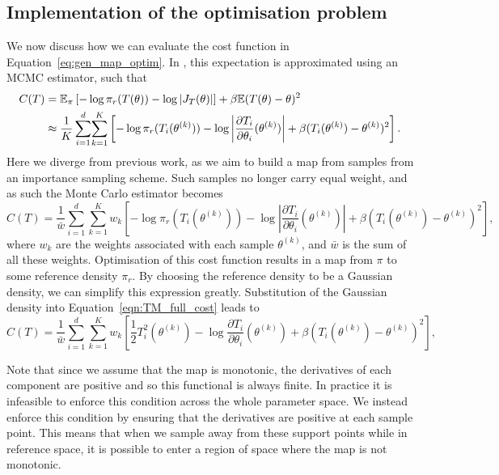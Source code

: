\documentclass[final]{siamltex}
\begin{document}
\subsection{Implementation of the optimisation problem}\label{sec:transport_implementation}

We now discuss how we can evaluate the cost function in
Equation~\eqref{eq:gen_map_optim}. In \cite{parno2014transport}, this
expectation is approximated using an MCMC estimator, such that
\begin{align}
	C(T) &= \mathbb{E}_\pi\left[ -\log\pi_r(T(\theta)) - \log|J_T(\theta)|\right] +
			\beta\mathbb{E}(T(\theta)-\theta)^2 \notag \\
		&\approx \frac{1}{K}\sum\limits_{i=1}^d \! \sum\limits_{k=1}^K \left[-\log\pi_r(T_i(\theta^{(k)})) -
			\log\left|\frac{\partial T_i}{\partial \theta_i}(\theta^{(k)})\right| + \beta(T_i(\theta^{(k)})-\theta^{(k)})^2\right]. 
\end{align}
Here we diverge from previous work, as we aim to build a map from
samples from an importance sampling scheme. Such samples no longer
carry equal weight, and as such the Monte Carlo estimator becomes
\begin{equation}\label{eqn:TM_full_cost}
	C(T) = \frac{1}{\bar{w}}\sum\limits_{i=1}^d \! \sum\limits_{k=1}^K
		w_k \left[-\log\pi_r(T_i(\theta^{(k)})) -
			\log\left|\frac{\partial T_i}{\partial \theta_i}(\theta^{(k)})\right| + \beta(T_i(\theta^{(k)})-\theta^{(k)})^2\right],
\end{equation}
where $w_k$ are the weights associated with each sample $\theta^{(k)}$, and $\bar{w}$ is the sum of
all these weights. Optimisation of this cost function results in a map from $\pi$ to some reference density $\pi_r$. By choosing the reference density to be a Gaussian density, we can simplify this expression greatly. Substitution of the Gaussian density into Equation~\eqref{eqn:TM_full_cost} leads to
\begin{equation}\label{eqn:TPAIS_objective}
	C(T) = \frac{1}{\bar{w}}\sum\limits_{i=1}^d \! \sum\limits_{k=1}^K
		w_k\left[\frac{1}{2}T_i^2(\theta^{(k)}) - \log\frac{\partial
		T_i}{\partial\theta_i}(\theta^{(k)}) + \beta(T_i(\theta^{(k)})-\theta^{(k)})^2\right],
\end{equation}

Note that since we assume that the map is monotonic, the derivatives of each component are
positive and so this functional is always finite. In practice it is infeasible to enforce this condition across the whole parameter space. We instead enforce this condition by ensuring that the derivatives are positive at each sample point. This means that when we sample away from these support points while in reference space, it is possible to enter a region of space where the map is not monotonic.
\end{document}
